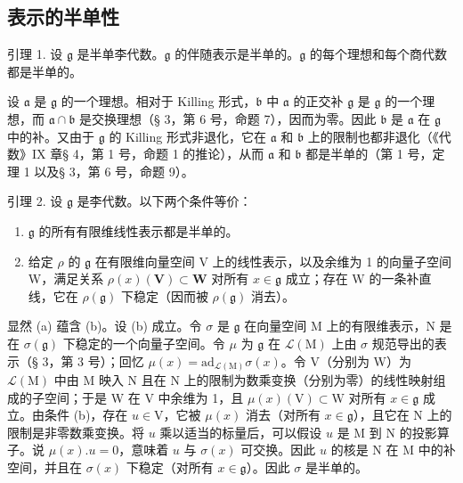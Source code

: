 \subsection{表示的半单性}

引理 1. 设 \(\mathfrak{g}\) 是半单李代数。\(\mathfrak{g}\) 的伴随表示是半单的。\(\mathfrak{g}\) 的每个理想和每个商代数都是半单的。

设 \(\mathfrak{a}\) 是 \(\mathfrak{g}\) 的一个理想。相对于 Killing 形式，\(\mathfrak{b}\) 中 \(\mathfrak{a}\) 的正交补 \(\mathfrak{g}\) 是 \(\mathfrak{g}\) 的一个理想，而 \(\mathfrak{a} \cap \mathfrak{b}\) 是交换理想（§ 3，第 6 号，命题 7），因而为零。因此 \(\mathfrak{b}\) 是 \(\mathfrak{a}\) 在 \(\mathfrak{g}\) 中的补。又由于 \(\mathfrak{g}\) 的 Killing 形式非退化，它在 \(\mathfrak{a}\) 和 \(\mathfrak{b}\) 上的限制也都非退化（《代数》IX 章§ 4，第 1 号，命题 1 的推论），从而 \(\mathfrak{a}\) 和 \(\mathfrak{b}\) 都是半单的（第 1 号，定理 1 以及§ 3，第 6 号，命题 9）。

引理 2. 设 \(\mathfrak{g}\) 是李代数。以下两个条件等价：

\begin{enumerate}
\def\labelenumi{(\alph{enumi})}
\item
  \(\mathfrak{g}\) 的所有有限维线性表示都是半单的。
\item
  给定 \(\rho\) 的 \(\mathfrak{g}\) 在有限维向量空间 V 上的线性表示，以及余维为 1 的向量子空间 W，满足关系 \(\rho(x)(\mathbf{V}) \subset \mathbf{W}\) 对所有 \(x \in \mathfrak{g}\) 成立；存在 W 的一条补直线，它在 \(\rho(\mathfrak{g})\) 下稳定（因而被 \(\rho(\mathfrak{g})\) 消去）。
\end{enumerate}

显然 (a) 蕴含 (b)。设 (b) 成立。令 \(\sigma\) 是 \(\mathfrak{g}\) 在向量空间 M 上的有限维表示，N 是在 \(\sigma(\mathfrak{g})\) 下稳定的一个向量子空间。令 \(\mu\) 为 \(\mathfrak{g}\) 在 \(\mathcal{L}(\mathrm{M})\) 上由 \(\sigma\) 规范导出的表示（§ 3，第 3 号）；回忆 \(\mu(x) = \mathrm{ad}_{\mathcal{L}(\mathrm{M})}\sigma(x)\)。令 V（分别为 W）为 \(\mathcal{L}(\mathrm{M})\) 中由 M 映入 N 且在 N 上的限制为数乘变换（分别为零）的线性映射组成的子空间；于是 W 在 V 中余维为 1，且 \(\mu(x)(\mathrm{V})\subset\mathrm{W}\) 对所有 \(x\in\mathfrak{g}\) 成立。由条件 (b)，存在 \(u\in\mathrm{V}\)，它被 \(\mu(x)\) 消去（对所有 \(x\in\mathfrak{g}\)），且它在 N 上的限制是非零数乘变换。将 \(u\) 乘以适当的标量后，可以假设 \(u\) 是 M 到 N 的投影算子。说 \(\mu(x).u=0\)，意味着 \(u\) 与 \(\sigma(x)\) 可交换。因此 \(u\) 的核是 N 在 M 中的补空间，并且在 \(\sigma(x)\) 下稳定（对所有 \(x\in\mathfrak{g}\)）。因此 \(\sigma\) 是半单的。

